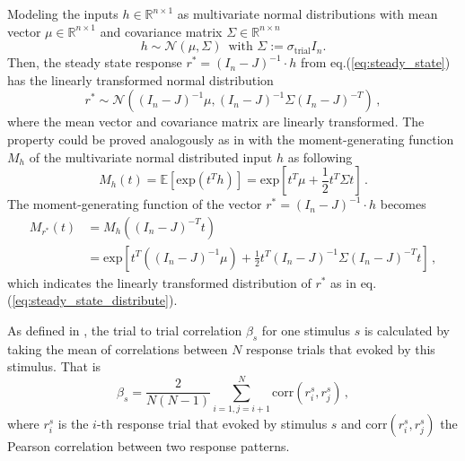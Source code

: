 \documentclass[11pt]{article}
\begin{document}
	Modeling the inputs $h \in \mathbb{R} ^{n \times 1}$ as multivariate normal distributions with mean vector $\mu \in \mathbb{R}^{n \times 1}$ and covariance matrix $\Sigma \in \mathbb{R}^{n \times n}$
		\begin{equation} \label{eq:input_distribution}
			h \sim \mathcal{N} (\mu, \Sigma) \, \text{ with } \Sigma := \sigma_{\text{trial}}I_n. 
		\end{equation}
	Then, the steady state response $r^* = (I_n - J)^{-1} \cdot h $ from eq.(\ref{eq:steady_state}) has the linearly transformed normal distribution
		\begin{equation} \label{eq:steady_state_distribute}
			r^* \sim \mathcal{N} \left((I_n - J)^{-1}\mu, (I_n - J)^{-1} \Sigma (I_n -J)^{-T}\right) \, ,
		\end{equation}
	where the mean vector and covariance matrix are linearly transformed. The property could be proved analogously as in \cite{Soch2019} with the moment-generating function $M_h$ of the multivariate normal distributed input $h$ as following
		\begin{equation}
			M_h(t) = \mathbb{E}\left[\text{exp}(t^Th)\right] = \text{exp} \left[t^T \mu + \frac{1}{2} t^T \Sigma t \right] \, .
		\end{equation}
	The moment-generating function of the vector $r^* = (I_n - J)^{-1} \cdot h$ becomes
		\begin{equation}
			\begin{split}
				M_{r^*}(t) & = M_h \left( (I_n-J)^{-T} t\right) \\
				        & = \text{exp} \left[
				         						t^T \left( (I_n - J)^{-1} \mu\right) + \frac{1}{2} t^T (I_n - J)^{-1} \Sigma (I_n - J)^{-T} t    
				         				\right] \, ,
			\end{split} 
		\end{equation}
	which indicates the linearly transformed distribution of $r^*$ as in eq.(\ref{eq:steady_state_distribute}).
	
	As defined in \cite{tragenap2023nature}, the trial to trial correlation $\beta_s$ for one stimulus $s$ is calculated by taking the mean of correlations between $N$ response trials that evoked by this stimulus. That is
		\begin{equation} \label{eq:ttc_sym}
			\beta_s = \frac{2}{N(N-1)} \sum_{i = 1, j = i+1}^{N} \text{corr}(r_i^s, r_j^s) \, ,
		\end{equation}
	where $r_i^s$ is the $i$-th response trial that evoked by stimulus $s$ and $\text{corr}(r_i^s, r_j^s)$ the Pearson correlation between two response patterns. 
	
\end{document}
